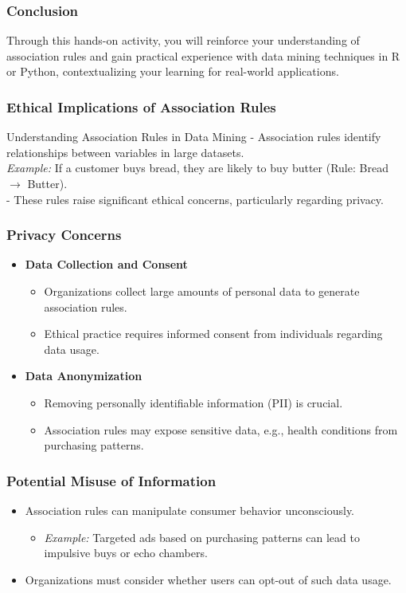 \documentclass[aspectratio=169]{beamer}
\begin{document}
\begin{frame}[fragile]
    \frametitle{Conclusion}
    Through this hands-on activity, you will reinforce your understanding of association rules and gain practical experience with data mining techniques in R or Python, contextualizing your learning for real-world applications.
\end{frame}

\begin{frame}[fragile]
    \frametitle{Ethical Implications of Association Rules}
    \begin{block}{Understanding Association Rules in Data Mining}
        - Association rules identify relationships between variables in large datasets.\\
        \textit{Example:} If a customer buys bread, they are likely to buy butter (Rule: Bread $\rightarrow$ Butter).\\
        - These rules raise significant ethical concerns, particularly regarding privacy.
    \end{block}
\end{frame}

\begin{frame}[fragile]
    \frametitle{Privacy Concerns}
    \begin{itemize}
        \item \textbf{Data Collection and Consent}
            \begin{itemize}
                \item Organizations collect large amounts of personal data to generate association rules.
                \item Ethical practice requires informed consent from individuals regarding data usage.
            \end{itemize}
        \item \textbf{Data Anonymization}
            \begin{itemize}
                \item Removing personally identifiable information (PII) is crucial.
                \item Association rules may expose sensitive data, e.g., health conditions from purchasing patterns.
            \end{itemize}
    \end{itemize}
\end{frame}

\begin{frame}[fragile]
    \frametitle{Potential Misuse of Information}
    \begin{itemize}
        \item Association rules can manipulate consumer behavior unconsciously.
            \begin{itemize}
                \item \textit{Example:} Targeted ads based on purchasing patterns can lead to impulsive buys or echo chambers.
            \end{itemize}
        \item Organizations must consider whether users can opt-out of such data usage.
    \end{itemize}
\end{frame}
\end{document}

